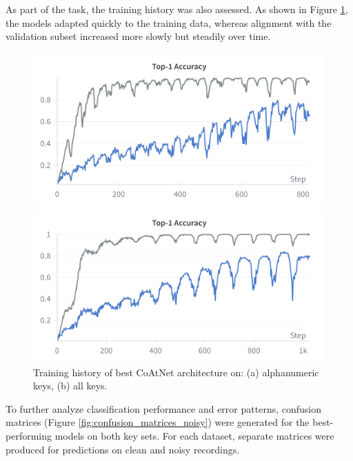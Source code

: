 \documentclass[a4paper,11pt,twoside]{report}
\theoremstyle{definition}
\begin{document}
As part of the task, the training history was also assessed. As shown in Figure \ref{fig:acc_noisy}, the models adapted quickly to the training data, whereas alignment with the validation subset increased more slowly but steadily over time.

\begin{figure}[h!]
  \centering
  \begin{minipage}{0.49\linewidth}
      \centering
      \includegraphics[width=\linewidth]{img_results/acc_noisy_alphanum.png}
      \subcaption{}
  \end{minipage}
  \hfill
  \begin{minipage}{0.49\linewidth}
      \centering
      \includegraphics[width=\linewidth]{img_results/acc_noisy_all.png}
      \subcaption{}
  \end{minipage}
  \caption{Training history of best CoAtNet architecture on: (a) alphanumeric keys, (b) all keys.}
  \label{fig:acc_noisy}
\end{figure}


To further analyze classification performance and error patterns, confusion matrices (Figure \ref{fig:confusion_matrices_noisy}) were generated for the best-performing models on both key sets. For each dataset, separate matrices were produced for predictions on clean and noisy recordings.
\end{document}
